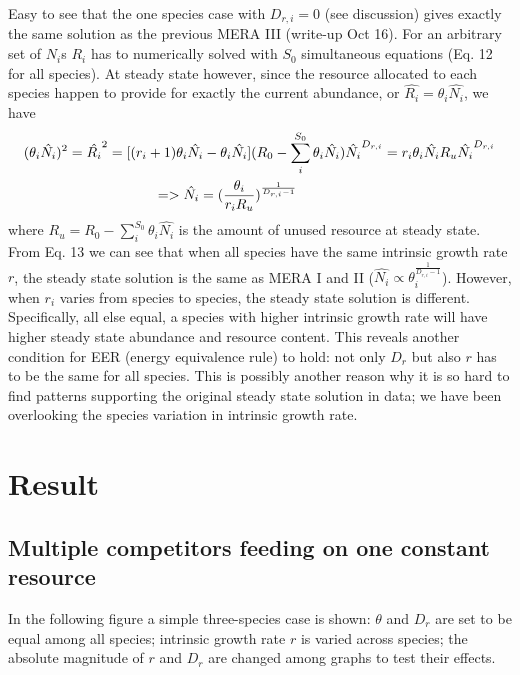 \documentclass[12pt]{article}
\begin{document}
Easy to see that the one species case with $D_{r,i}=0$ (see discussion) gives exactly the same solution as the previous MERA III (write-up Oct 16). For an arbitrary set of $N_i$s $R_i$ has to numerically solved with $S_0$ simultaneous equations (Eq. 12 for all species). At steady state however, since the resource allocated to each species happen to provide for exactly the current abundance, or  $\hat{R_i} = \theta_i \hat{N_i}$, we have
  \begin{equation}
   \begin{split}
(\theta_i \hat{N_i})^2 =\hat{R_i}^2=  [(r_i+1)\theta_i \hat{N_i} -\theta_i \hat{N_i}](R_0 -\sum_i^{S_0}\theta_i \hat{N_i}) \hat{N_i} ^{D_{r,i}}
= r_i \theta_i \hat{N_i} R_u \hat{N_i} ^{D_{r,i}} \\
=> \hat{N_i} = (\frac{\theta_i}{r_i R_u})^{\frac{1}{D_{r,i}-1}}\hskip 5cm
\end{split}
\end{equation}
where $R_u = R_0 -\sum_i^{S_0}\theta_i \hat{N_i}$ is the amount of unused resource at steady state. From Eq. 13 we can see that when all species have the same intrinsic growth rate $r$, the steady state solution is the same as MERA I and II ($ \hat{N_i} \propto  \theta_i ^{\frac{1}{D_{r,i}-1}}$). However, when $r_i$ varies from species to species, the steady state solution is different. Specifically, all else equal, a species with higher intrinsic growth rate will have higher steady state abundance and resource content. This reveals another condition for EER (energy equivalence rule) to hold: not only $D_r$ but also $r$ has to be the same for all species. This is possibly another reason why it is so hard to find patterns supporting the original steady state solution in data; we have been overlooking the species variation in intrinsic growth rate.

\section{Result}
\subsection{Multiple competitors feeding on one constant resource}
In the following figure a simple three-species case is shown: $\theta$ and $D_r$ are set to be equal among all species; intrinsic growth rate $r$ is varied across species; the absolute magnitude of $r$ and $D_r$ are changed among graphs to test their effects.
\end{document}
